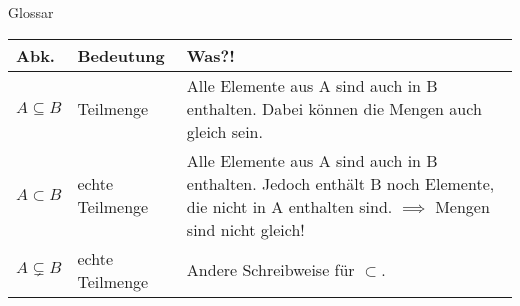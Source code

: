 \begin{frame}[fragile]{Glossar}
    \small
    \begin{tabular}{p{} p{} p{}}
    \toprule
    Abk.&Bedeutung&Was?!\\
    \midrule
        $A \subseteq B$ & Teilmenge & Alle Elemente aus A sind auch in B enthalten. Dabei können die Mengen auch gleich sein.\\
        $A \subset B$ & echte Teilmenge & Alle Elemente aus A sind auch in B enthalten. Jedoch enthält B noch Elemente, die nicht in A enthalten sind.
        $\implies$ Mengen sind nicht gleich!\\
        $A \subsetneq B$ & echte Teilmenge & Andere Schreibweise für $\subset$.\\
    \bottomrule
    \end{tabular}
\end{frame}








